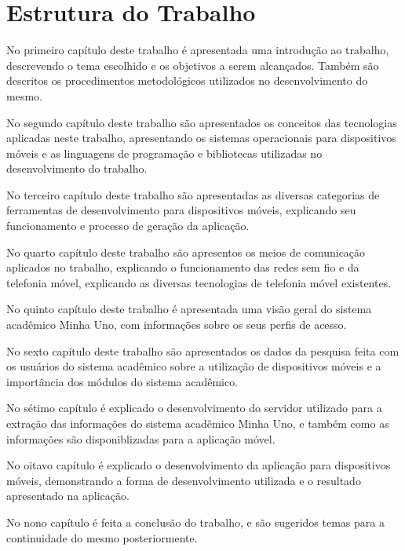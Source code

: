 \section{Estrutura do Trabalho}
No primeiro capítulo deste trabalho é apresentada uma introdução ao trabalho, descrevendo o tema escolhido e os objetivos a serem alcançados. Também são descritos os procedimentos metodológicos utilizados no desenvolvimento do mesmo.

No segundo capítulo deste trabalho são apresentados os conceitos das tecnologias aplicadas neste trabalho, apresentando os sistemas operacionais para dispositivos móveis e as linguagens de programação e bibliotecas utilizadas no desenvolvimento do trabalho.

No terceiro capítulo deste trabalho são apresentadas as diversas categorias de ferramentas de desenvolvimento para dispositivos móveis, explicando seu funcionamento e processo de geração da aplicação.

No quarto capítulo deste trabalho são apresentos os meios de comunicação aplicados no trabalho, explicando o funcionamento das redes sem fio e da telefonia móvel, explicando as diversas tecnologias de telefonia móvel existentes.

No quinto capítulo deste trabalho é apresentada uma visão geral do sistema acadêmico Minha Uno, com informações sobre os seus perfis de acesso.

No sexto capítulo deste trabalho são apresentados os dados da pesquisa feita com os usuários do sistema acadêmico sobre a utilização de dispositivos móveis e a importância dos módulos do sistema acadêmico.

No sétimo capítulo é explicado o desenvolvimento do servidor utilizado para a extração das informações do sistema acadêmico Minha Uno, e também como as informações são disponiblizadas para a aplicação móvel.

No oitavo capítulo é explicado o desenvolvimento da aplicação para dispositivos móveis, demonstrando a forma de desenvolvimento utilizada e o resultado apresentado na aplicação.

No nono capítulo é feita a conclusão do trabalho, e são sugeridos temas para a continuidade do mesmo posteriormente.